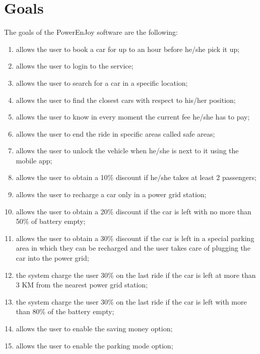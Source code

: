 \section{Goals}
The goals of the PowerEnJoy software are the following:
\begin{enumerate}
	\item allows the user to book a car for up to an hour before he/she pick it up;
	\item allows the user to login to the service;  
	\item allows the user to search for a car in a specific location; 
	\item allows the user to find the closest cars with respect to his/her position; 
	\item allows the user to know in every moment the current fee he/she has to pay;
	\item allows the user to end the ride in specific areas called safe areas;
	\item allows the user to unlock the vehicle when he/she is next to it using the mobile app;
	\item allows the user to obtain a 10\% discount if he/she takes at least 2 passengers;
	\item allows the user to recharge a car only in a power grid station;
	\item allows the user to obtain a 20\% discount if the car is left with no more than 50\% of battery empty;
	\item allows the user to obtain a 30\% discount if the car is left in a special parking area in which they can be recharged and the user takes care of plugging the car into the power grid;
	\item the system charge the user 30\% on the last ride if the car is left at more than 3 KM from the nearest power grid station;
	\item the system charge the user 30\% on the last ride if the car is left with more than 80\% of the battery empty;
	\item allows the user to enable the saving money option;
	\item allows the user to enable the parking mode option;
	
	
\end{enumerate}